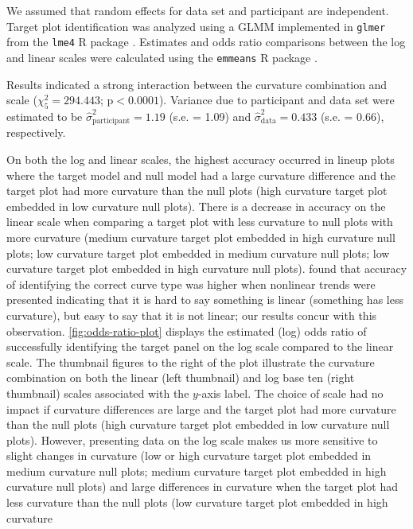 \documentclass[12pt]{article}
\begin{document}
\noindent We assumed that random effects for data set and participant
are independent. Target plot identification was analyzed using a GLMM
implemented in \texttt{glmer} from the \texttt{lme4} R package
\citep{lme4}. Estimates and odds ratio comparisons between the log and
linear scales were calculated using the \texttt{emmeans} R package
\citep{emmeans}.

Results indicated a strong interaction between the curvature combination
and scale (\(\chi^2_5 = 294.443\); \(\text{p} <0.0001\)). Variance due
to participant and data set were estimated to be
\(\hat\sigma^2_{\text{participant}} = 1.19\) (s.e. = 1.09) and
\(\hat\sigma^2_{\text{data}} = 0.433\) (s.e. = 0.66), respectively.

On both the log and linear scales, the highest accuracy occurred in
lineup plots where the target model and null model had a large curvature
difference and the target plot had more curvature than the null plots
(high curvature target plot embedded in low curvature null plots). There
is a decrease in accuracy on the linear scale when comparing a target
plot with less curvature to null plots with more curvature (medium
curvature target plot embedded in high curvature null plots; low
curvature target plot embedded in medium curvature null plots; low
curvature target plot embedded in high curvature null plots).
\citet{best_perception_2007} found that accuracy of identifying the
correct curve type was higher when nonlinear trends were presented
indicating that it is hard to say something is linear (something has
less curvature), but easy to say that it is not linear; our results
concur with this observation. \cref{fig:odds-ratio-plot} displays the
estimated (log) odds ratio of successfully identifying the target panel
on the log scale compared to the linear scale. The thumbnail figures to
the right of the plot illustrate the curvature combination on both the
linear (left thumbnail) and log base ten (right thumbnail) scales
associated with the \(y\)-axis label. The choice of scale had no impact
if curvature differences are large and the target plot had more
curvature than the null plots (high curvature target plot embedded in
low curvature null plots). However, presenting data on the log scale
makes us more sensitive to slight changes in curvature (low or high
curvature target plot embedded in medium curvature null plots; medium
curvature target plot embedded in high curvature null plots) and large
differences in curvature when the target plot had less curvature than
the null plots (low curvature target plot embedded in high curvature
\end{document}
